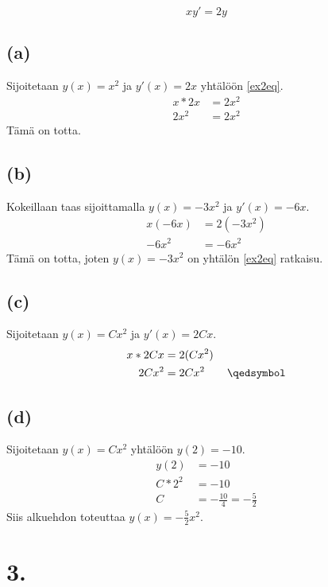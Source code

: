 \documentclass{article}
\begin{document}
\begin{equation}\label{ex2eq}
  xy' = 2y
\end{equation}

\subsection*{(a)}

Sijoitetaan $y(x) = x^2$ ja $y'(x) = 2x$ yhtälöön \ref{ex2eq}.
\begin{align*}
  x*2x &= 2x^2 \\
  2x^2 &= 2x^2
\end{align*}
Tämä on totta.

\subsection*{(b)}

Kokeillaan taas sijoittamalla $y(x) = -3x^2$ ja $y'(x) = -6x$.
\begin{align*}
  x(-6x) &= 2(-3x^2) \\
  -6x^2 &= -6x^2
\end{align*}
Tämä on totta, joten $y(x) = -3x^2$ on yhtälön \ref{ex2eq} ratkaisu.

\subsection*{(c)}

Sijoitetaan $y(x) = Cx^2$ ja $y'(x) = 2Cx$.
\begin{align*}
  x * 2Cx &= 2(Cx^2) \\
  2Cx^2 &= 2Cx^2 \qquad \qedsymbol
\end{align*}

\subsection*{(d)}

Sijoitetaan $y(x) = Cx^2$ yhtälöön $y(2) = -10$.
\begin{align*}
  y(2) &= -10 \\
  C * 2^2 &= -10 \\
  C &= -\frac{10}{4} = -\frac{5}{2}
\end{align*}
Siis alkuehdon toteuttaa $y(x) = -\frac{5}{2}x^2$.

\section*{3.}
\end{document}
